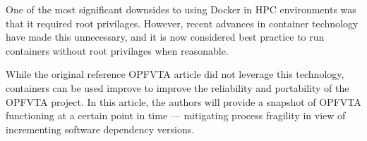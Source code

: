 One of the most significant downsides to using Docker in HPC environments was that it required root privilages.
However, recent advances in container technology have made this unnecessary, and it is now considered best practice to run containers without root privilages when reasonable.

While the original reference OPFVTA article did not leverage this technology, containers can be used improve to improve the reliability and portability of the OPFVTA project.
In this article, the authors will provide a snapshot of OPFVTA functioning at a certain point in time — mitigating process fragility in view of incrementing software dependency versions.
